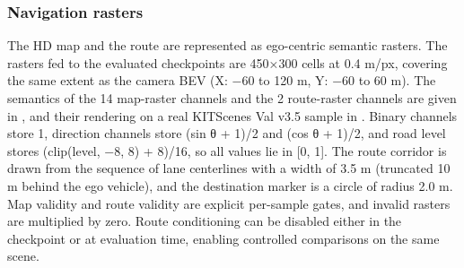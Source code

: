 \documentclass[
  english,
  10pt,
]{article}
\begin{document}
\subsubsection{Navigation rasters}\label{navigation-rasters}

The HD map and the route are represented as ego-centric semantic
rasters. The rasters fed to the evaluated checkpoints are 450×300 cells
at 0.4 m/px, covering the same extent as the camera BEV (X: −60 to 120
m, Y: −60 to 60 m). The semantics of the 14 map-raster channels and the
2 route-raster channels are given in \hyperref[tab-channels]{}, and
their rendering on a real KITScenes Val v3.5 sample in
\hyperref[fig-channels]{}. Binary channels store 1, direction channels
store (sin θ + 1)/2 and (cos θ + 1)/2, and road level stores
(clip(level, −8, 8) + 8)/16, so all values lie in {[}0, 1{]}. The route
corridor is drawn from the sequence of lane centerlines with a width of
3.5 m (truncated 10 m behind the ego vehicle), and the destination
marker is a circle of radius 2.0 m. Map validity and route validity are
explicit per-sample gates, and invalid rasters are multiplied by zero.
Route conditioning can be disabled either in the checkpoint or at
evaluation time, enabling controlled comparisons on the same scene.
\end{document}
